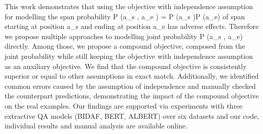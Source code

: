 This work demonstrates that using the objective with independence assumption for modelling the span probability P (a\_s , a\_e ) = P (a\_s )P (a\_e) of span starting at position a\_s and ending at position a\_e has adverse effects. Therefore we propose multiple approaches to modelling joint probability P (a\_s , a\_e) directly. Among those, we propose a compound objective, composed from the joint probability while still keeping the objective with independence assumption as an auxiliary objective. We find that the compound objective is consistently superior or equal to other assumptions in exact match. Additionally, we identified common errors caused by the assumption of independence and manually checked the counterpart predictions, demonstrating the impact of the compound objective on the real examples. Our findings are supported via experiments with three extractive QA models (BIDAF, BERT, ALBERT) over six datasets and our code, individual results and manual analysis are available online.
